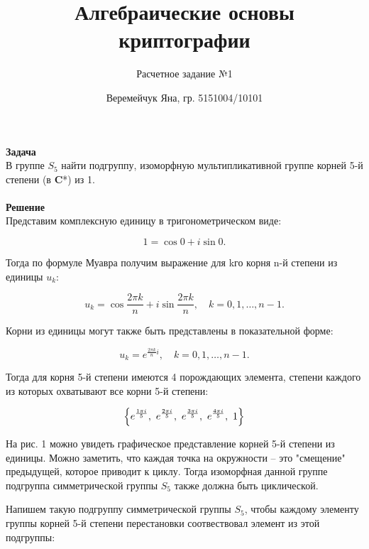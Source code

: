 \documentclass{article}
\title{Алгебраические основы криптографии}
\author{Расчетное задание №1}
\date{Веремейчук Яна, гр. 5151004/10101}
\begin{document}
\maketitle

\textbf{Задача}\\

В группе $S_{5}$ найти подгруппу, изоморфную мультипликативной группе
корней 5-й степени (в \textbf{C}*) из 1.\\
\\

\textbf{Решение}\\

Представим комплексную единицу в тригонометрическом виде:

\[1=\cos 0+i\sin 0.\]

Тогда по формуле Муавра получим выражение для kго корня n-й степени из единицы $u_{k}$:

\[ u_{k}=\cos {\frac {2\pi k}{n}}+i\sin {\frac {2\pi k}{n}},\quad k=0,1,\dots ,n-1. \]

Корни из единицы могут также быть представлены в показательной форме:

\[ u_{k}=e^{{\frac {2\pi k}{n}}i},\quad k=0,1,\dots ,n-1. \]

Тогда для корня 5-й степени имеются 4 порождающих элемента, степени каждого из которых охватывают все корни 5-й степени:

\[
{\Big \{}
e^{\frac {1\pi i}{5}},\
e^{\frac {2\pi i}{5}},\
e^{\frac {3\pi i}{5}},\
e^{\frac {4\pi i}{5}},\
1
{\Big \}}\\
\]

На рис. 1 можно увидеть графическое представление корней 5-й степени из единицы. Можно заметить, что каждая точка на окружности -- это "смещение" предыдущей, которое приводит к циклу. Тогда изоморфная данной группе подгруппа симметрической группы $S_{5}$ также должна быть циклической.

Напишем такую подгруппу симметрической группы $S_{5}$, чтобы каждому элементу группы корней 5-й степени перестановки соотвествовал элемент из этой подгруппы:
\end{document}

